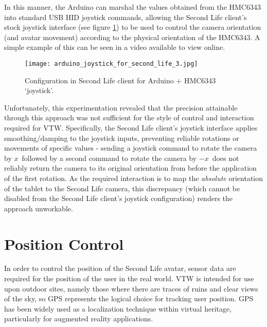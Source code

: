 
In this manner, the Arduino can marshal the values obtained from the HMC6343 into standard USB HID joystick commands, allowing the Second Life client's stock joystick interface (see figure \ref{arduino_joystick_for_second_life_3.jpg}) to be used to control the camera orientation (and avatar movement) according to the physical orientation of the HMC6343. A simple example of this can be seen in a video available to view online\ArduinoJoystickVideoFootnote{}.

\begin{figure}[h]
\centering
  \texttt{[image: arduino\_joystick\_for\_second\_life\_3.jpg]}
  \caption{Configuration in Second Life client for Arduino + HMC6343 `joystick'.}
  \label{arduino_joystick_for_second_life_3.jpg}
\end{figure}

Unfortunately, this experimentation revealed that the precision attainable through this approach was not sufficient for the style of control and interaction required for VTW. Specifically, the Second Life client's joystick interface applies smoothing/damping to the joystick inputs, preventing reliable rotations or movements of specific values - sending a joystick command to rotate the camera by $x$\textdegree\ followed by a second command to rotate the camera by $-x$\textdegree\ does not reliably return the camera to its original orientation from before the application of the first rotation. As the required interaction is to map the \textit{absolute} orientation of the tablet to the Second Life camera, this discrepancy (which cannot be disabled from the Second Life client's joystick configuration) renders the approach unworkable.


\section{Position Control}
\label{second_life_position_control}

In order to control the position of the Second Life avatar, sensor data are required for the position of the user in the real world. VTW is intended for use upon outdoor sites, namely those where there are traces of ruins and clear views of the sky, so GPS represents the logical choice for tracking user position. GPS has been widely used as a localization technique within virtual heritage, particularly for augmented reality applications.

